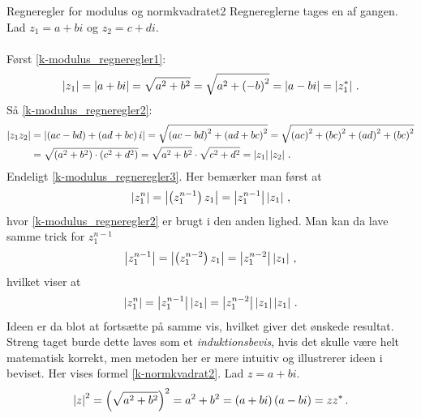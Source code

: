 \begin{opgave}{Regneregler for modulus og normkvadratet}{2}
\opg Regnereglerne tages en af gangen. Lad $z_1 = a+bi$ og $z_2 = c+di$.\\ \\
Først \eqref{k-modulus_regneregler1}:
\begin{align*}
\left| z_1 \right| = \left| a+bi \right| = \sqrt{a^2+b^2} = \sqrt{a^2+\left(-b\right)^2} = \left| a-bi \right| = \left| z_1^* \right| \, .
\end{align*}
Så \eqref{k-modulus_regneregler2}:
\begin{align*}
\left| z_1z_2 \right| &= \left| \left(ac-bd\right) + \left(ad+bc\right)i \right| = \sqrt{\left(ac-bd\right)^2 + \left(ad+bc\right)^2} = \sqrt{\left(ac\right)^2 + \left(bc\right)^2 + \left(ad\right)^2 + \left(bc\right)^2} \\
&= \sqrt{\left(a^2+b^2\right) \cdot \left(c^2+d^2\right)} = \sqrt{a^2+b^2} \cdot\sqrt{c^2+d^2} = \left| z_1 \right|\left| z_2 \right| \, .  
\end{align*}
Endeligt \eqref{k-modulus_regneregler3}. Her bemærker man først at
\begin{align*}
\left| z_1^n \right| = \left| \left(z_1^{n-1}\right)z_1 \right| = \left| z_1^{n-1} \right|\left| z_1 \right| \, , 
\end{align*}
hvor \eqref{k-modulus_regneregler2} er brugt i  den anden lighed. Man kan da lave samme trick for $z_1^{n-1}$
\begin{align*}
\left| z_1^{n-1} \right| = \left| \left(z_1^{n-2}\right)z_1 \right| = \left| z_1^{n-2} \right|\left| z_1 \right| \, ,
\end{align*}  
hvilket viser at
\begin{align*}
\left| z_1^n \right| = \left| z_1^{n-1} \right|\left| z_1 \right| = \left| z_1^{n-2} \right|\left| z_1 \right|\left| z_1 \right| \, .
\end{align*}
Ideen er da blot at fortsætte på samme vis, hvilket giver det ønskede resultat. Streng taget burde dette laves som et \emph{induktionsbevis}, hvis det skulle være helt matematisk korrekt, men metoden her er mere intuitiv og illustrerer ideen i beviset.
\opg Her vises formel \eqref{k-normkvadrat2}. Lad $z=a+bi$.
\begin{align*}
\left| z \right|^2 = \left(\sqrt{a^2+b^2}\right)^2 = a^2+b^2 = \left(a+bi\right)\left(a-bi\right) = zz^* \, .
\end{align*}
\end{opgave}
